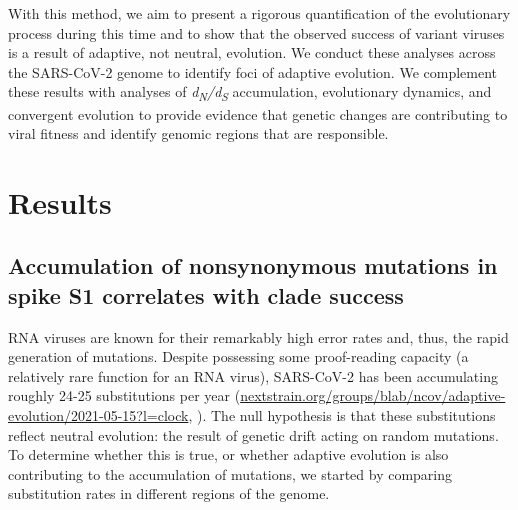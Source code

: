 \documentclass[11pt,oneside,letterpaper]{article}
\newcommand{\dnds}{\emph{d\textsubscript{N}/d\textsubscript{S}}}
\begin{document}
With this method, we aim to present a rigorous quantification of the evolutionary process during this time and to show that the observed success of variant viruses is a result of adaptive, not neutral, evolution.
We conduct these analyses across the SARS-CoV-2 genome to identify foci of adaptive evolution.
We complement these results with analyses of \dnds{} accumulation, evolutionary dynamics, and convergent evolution to provide evidence that genetic changes are contributing to viral fitness and identify genomic regions that are responsible.


\section*{Results}
\subsection*{Accumulation of nonsynonymous mutations in spike S1 correlates with clade success}
RNA viruses are known for their remarkably high error rates and, thus, the rapid generation of mutations.
Despite possessing some proof-reading capacity (a relatively rare function for an RNA virus), SARS-CoV-2 has been accumulating roughly 24-25 substitutions per year (\href{https://nextstrain.org/groups/blab/ncov/adaptive-evolution/2021-05-15?l=clock}{nextstrain.org/groups/blab/ncov/adaptive-evolution/2021-05-15?l=clock}, \cite{Hadfield2018-wr}).
The null hypothesis is that these substitutions reflect neutral evolution: the result of genetic drift acting on random mutations.
To determine whether this is true, or whether adaptive evolution is also contributing to the accumulation of mutations, we started by comparing substitution rates in different regions of the genome.
\end{document}

